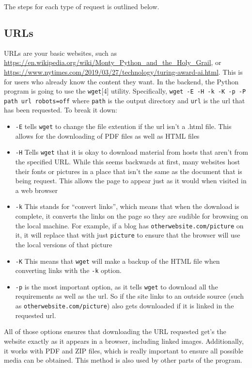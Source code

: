 \documentclass{article}
\begin{document}
The steps for each type of request is outlined below.

\subsection{URLs}

URLs are your basic websites, such as
\url{https://en.wikipedia.org/wiki/Monty_Python_and_the_Holy_Grail},
or
\url{https://www.nytimes.com/2019/03/27/technology/turing-award-ai.html}. This
is for users who already know the content they want. In the backend,
the Python program is going to use the \texttt{wget}[4]
utility. Specifically, \texttt{wget -E -H -k -K -p -P path url
  robots=off} where \texttt{path} is the output directory and
\texttt{url} is the url that has been requested. To break it down:
\begin{itemize}
  \item \texttt{-E} tells \texttt{wget} to change the file extention
    if the url isn't a .html file. This allows for the downloading of
    PDF files as well as HTML files
  \item \texttt{-H} Tells \texttt{wget} that it is okay to download
    material from hosts that aren't from the specified URL. While this
    seems backwards at first, many websites host their fonts or
    pictures in a place that isn't the same as the document that is
    being request. This allows the page to appear just as it would
    when visited in a web browser
  \item \texttt{-k} This stands for ``convert links'', which means
    that when the download is complete, it converts the links on the
    page so they are sudible for browsing on the local machine. For
    example, if a blog has \texttt{otherwebsite.com/picture} on it, it
    will replace that with just \texttt{picture} to ensure that the
    browser will use the local versions of that picture
  \item \texttt{-K} This means that \texttt{wget} will make a backup
    of the HTML file when converting links with the \texttt{-k}
    option.
  \item \texttt{-p} is the most important option, as it tells
    \texttt{wget} to download all the requirements as well as the
    url. So if the site links to an outside source (such as
    \texttt{otherwebsite.com/picture}) also gets downloaded if it is
    linked in the requested url.
  \end{itemize}
All of those options ensures that downloading the URL requested get's
the website exactly as it appears in a browser, including linked
images. Additionally, it works with PDF and ZIP files, which is really
important to ensure all possible media can be obtained. This method is
also used by other parts of the program.
\end{document}
